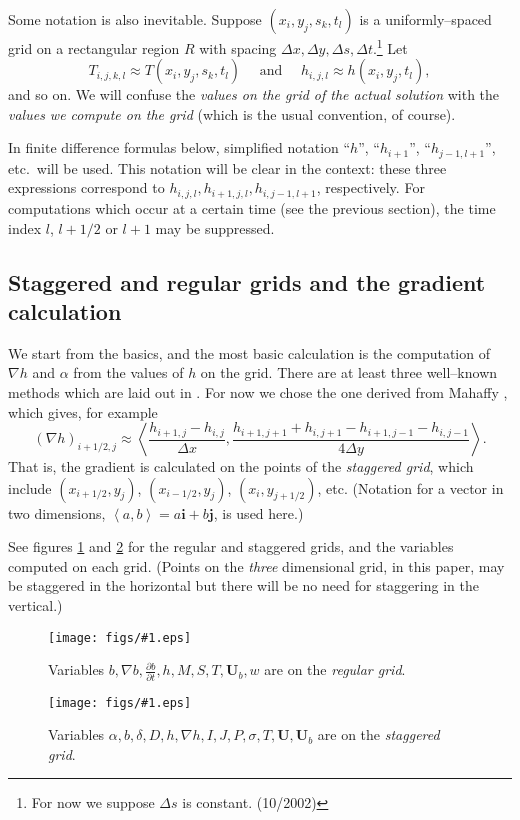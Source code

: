 \documentclass[12pt,final]{amsart}%
\theoremstyle{plain}
\theoremstyle{definition}
\theoremstyle{remark}
\newcommand{\regfigure}[2]{\texttt{[image: figs/\#1.eps]}}
\newcommand{\ddt}[1]{\ensuremath{\frac{\partial #1}{\partial t}}}
\newcommand{\grad}{\nabla}
\newcommand{\ihat}{\mathbf{i}}
\newcommand{\ip}[2]{\ensuremath{\left<#1,#2\right>}}
\newcommand{\jhat}{\mathbf{j}}
\newcommand{\bU}{{\mathbf{U}}}
\begin{document}
Some notation is also inevitable.  Suppose $(x_i,y_j,s_k,t_l)$ is a uniformly--spaced grid on a rectangular region $R$ with spacing $\Delta x,\Delta y, \Delta s,\Delta t$.\footnote{For now we suppose $\Delta s$ is constant.  (10/2002)}  Let
    $$T_{i,j,k,l} \approx T(x_i,y_j,s_k,t_l) \quad \text{ and }\quad h_{i,j,l}\approx h(x_i,y_j,t_l),$$
and so on.  We will confuse the \emph{values on the grid of the actual solution} with the \emph{values we compute on the grid}  (which is the usual convention, of course).

In finite difference formulas below, simplified notation ``$h$'', ``$h_{i+1}$'', ``$h_{j-1,l+1}$'', etc.~will be used.  This notation will be clear in the context: these three expressions correspond to $h_{i,j,l},h_{i+1,j,l},h_{i,j-1,l+1}$, respectively.  For computations which occur at a certain time (see the previous section), the time index $l$, $l+1/2$ or $l+1$ may be suppressed.

\subsection*{Staggered and regular grids and the gradient calculation}  We start from the basics, and the most basic calculation is the computation of $\grad h$ and $\alpha$ from the values of $h$ on the grid.  There are at least three well--known methods which are laid out in \citep{HindmarshPayne}.  For now we chose the one derived from Mahaffy \citep{Mahaffy}, which gives, for example
    $$(\grad h)_{i+1/2,j} \approx \ip{\frac{h_{i+1,j}-h_{i,j}}{\Delta x}}{\frac{h_{i+1,j+1}+h_{i,j+1}-h_{i+1,j-1}-h_{i,j-1}}{4\Delta y}}.$$
That is, the gradient is calculated on the points of the \emph{staggered grid}, which include $(x_{i+1/2},y_j)$, $(x_{i-1/2},y_j)$, $(x_i,y_{j+1/2})$, etc.  (Notation for a vector in two dimensions, $\ip{a}{b}=a\ihat+b\jhat$, is used here.)

See figures \ref{regsten} and \ref{stagsten} for the regular and staggered grids, and the variables computed on each grid.  (Points on the \emph{three} dimensional grid, in this paper, may be staggered in the horizontal but there will be no need for staggering in the vertical.)

\begin{figure}[ht]
\regfigure{reggridsten}{2}
\caption{Variables $b, \grad b, \ddt{b}, h, M, S, T, \bU_b, w$ are on the \emph{regular grid}.}
\label{regsten}
\end{figure}

\begin{figure}[ht]
\regfigure{staggridsten}{2}
\vspace{-4mm}
\caption{Variables $\alpha, b, \delta, D, h, \grad h, I, J, P, \sigma, T, \bU, \bU_b$ are on the \emph{staggered grid}.}
\label{stagsten}
\end{figure}
\end{document}
